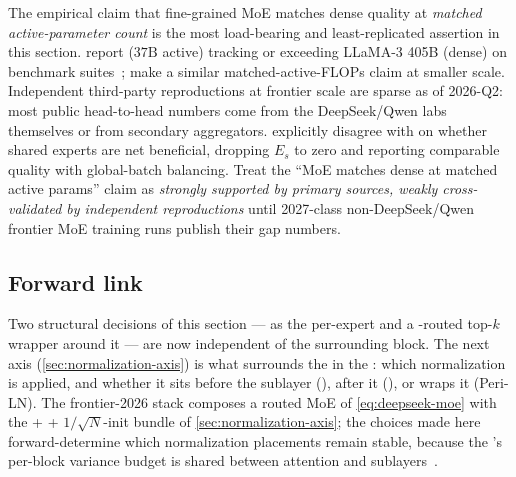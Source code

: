 \begin{contradiction}
The empirical claim that fine-grained MoE matches dense
quality at \emph{matched active-parameter count} is the most
load-bearing and least-replicated assertion in this section. \citet{deepseek-v3}
report  ($37\mathrm{B}$ active) tracking or exceeding
LLaMA-3 405B (dense) on benchmark
suites~\citep[abstract]{deepseek-v3}; \citet{deepseekmoe2024}
make a similar matched-active-FLOPs claim at smaller scale.
Independent third-party reproductions at frontier scale are sparse as
of 2026-Q2: most public head-to-head numbers come from the
DeepSeek/Qwen labs themselves or from secondary aggregators. \citet{qwen3}
explicitly disagree with \citet{deepseek-v3} on whether shared
experts are net beneficial, dropping $E_s$ to zero and reporting
comparable quality with global-batch balancing. Treat the
``MoE matches dense at matched active params'' claim as
\emph{strongly supported by primary sources, weakly cross-validated
by independent reproductions} until 2027-class non-DeepSeek/Qwen
frontier MoE training runs publish their gap numbers.
\end{contradiction}

\subsection{Forward link}
\label{sec:ffn-forward}

Two structural decisions of this section ---  as the per-expert
 and a -routed top-$k$ wrapper around it --- are now
independent of the surrounding block. The next axis
(\cref{sec:normalization-axis}) is what surrounds the  in the
: which normalization is applied, and whether it sits
before the sublayer (), after it (), or wraps it
(Peri-LN). The frontier-2026 stack composes a routed  MoE
of \cref{eq:deepseek-moe} with the  +  +
$1/\sqrt{N}$-init bundle of \cref{sec:normalization-axis}; the 
choices made here forward-determine which normalization placements
remain stable, because the 's per-block variance budget
is shared between attention and 
sublayers~\citep{xiong2020}.
